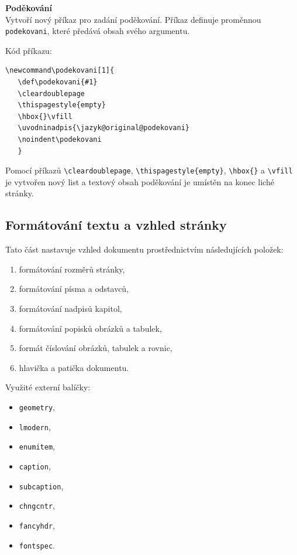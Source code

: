 \vspace{8pt}
\textbf{Poděkování}\\
Vytvoří nový příkaz pro zadání poděkování. Příkaz definuje proměnnou \verb|podekovani|, které předává obsah svého argumentu.

\newpage
Kód příkazu:

\begin{verbatim}
\newcommand\podekovani[1]{
   \def\podekovani{#1}
   \cleardoublepage
   \thispagestyle{empty}
   \hbox{}\vfill
   \uvodninadpis{\jazyk@original@podekovani}
   \noindent\podekovani
   }
\end{verbatim}

Pomocí příkazů \verb|\cleardoublepage|, \verb|\thispagestyle{empty}|, \verb|\hbox{}| a \verb|\vfill| je vytvořen nový list a textový obsah poděkování je umístěn na konec liché stránky.



\subsection{Formátování textu a vzhled stránky}
\label{sec:formatovani}
Tato část nastavuje vzhled dokumentu prostřednictvím následujících položek:

\begin{enumerate}
	\item formátování rozměrů stránky,
	\item formátování písma a odstavců,
	\item formátování nadpisů kapitol,
	\item formátování popisků obrázků a tabulek,
	\item formát číslování obrázků, tabulek a rovnic,
	\item hlavička a patička dokumentu.
\end{enumerate}

Využité externí balíčky:

\begin{multicols}{2}
	\begin{itemize}[label=-]
		\item \verb|geometry|,
		\item \verb|lmodern|,
		\item \verb|enumitem|,
		\item \verb|caption|,
	\columnbreak
		\item \verb|subcaption|,
		\item \verb|chngcntr|,
		\item \verb|fancyhdr|,
		\item \verb|fontspec|.
	\end{itemize}
\end{multicols}

